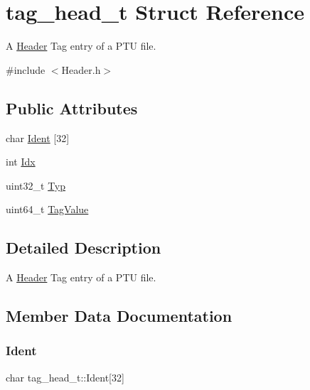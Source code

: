 \hypertarget{structtag__head__t}{}\section{tag\+\_\+head\+\_\+t Struct Reference}
\label{structtag__head__t}


A \hyperlink{class_header}{Header} Tag entry of a P\+TU file.  




{\ttfamily \#include $<$Header.\+h$>$}

\subsection*{Public Attributes}
\begin{DoxyCompactItemize}
\item 
char \hyperlink{structtag__head__t_a01ee67ad30687b626c72fd3066ae21b3}{Ident} \mbox{[}32\mbox{]}
\item 
int \hyperlink{structtag__head__t_a024fc4b10d8120d21842fb1dae8e3c67}{Idx}
\item 
uint32\+\_\+t \hyperlink{structtag__head__t_ad3f52d70ea59814ad8acb60ebbe155e3}{Typ}
\item 
uint64\+\_\+t \hyperlink{structtag__head__t_ac340e31698e1406e0fb4cc0e207b0925}{Tag\+Value}
\end{DoxyCompactItemize}


\subsection{Detailed Description}
A \hyperlink{class_header}{Header} Tag entry of a P\+TU file. 

\subsection{Member Data Documentation}
\mbox{\label{structtag__head__t_a01ee67ad30687b626c72fd3066ae21b3}} 
\subsubsection{\texorpdfstring{Ident}{Ident}}
{\footnotesize\ttfamily char tag\+\_\+head\+\_\+t\+::\+Ident\mbox{[}32\mbox{]}}

\mbox{\label{structtag__head__t_a024fc4b10d8120d21842fb1dae8e3c67}} 

